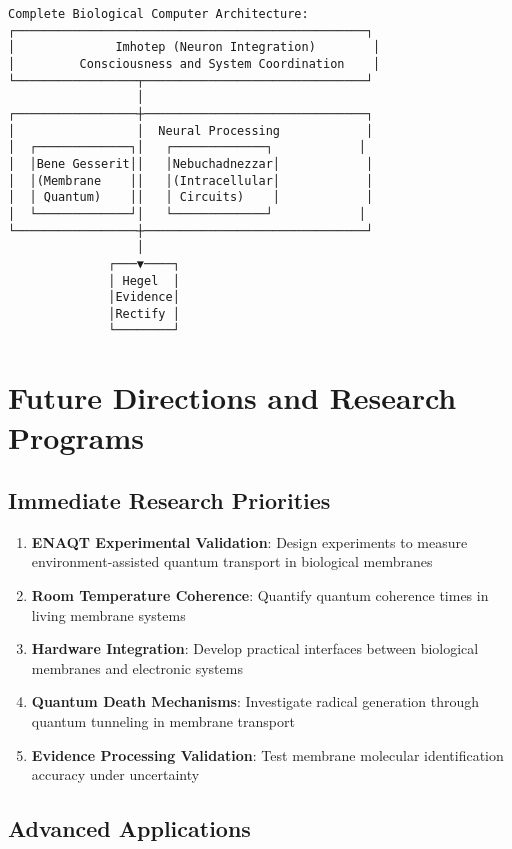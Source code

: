 \documentclass[12pt,a4paper]{article}
\begin{document}
\begin{verbatim}
Complete Biological Computer Architecture:
┌─────────────────────────────────────────────────┐
│              Imhotep (Neuron Integration)        │
│         Consciousness and System Coordination    │
└─────────────────┬───────────────────────────────┘
                  │
┌─────────────────┼───────────────────────────────┐
│                 │  Neural Processing            │
│  ┌─────────────┐│   ┌─────────────┐            │
│  │Bene Gesserit││   │Nebuchadnezzar│            │
│  │(Membrane    ││   │(Intracellular│            │
│  │ Quantum)    ││   │ Circuits)    │            │
│  └─────────────┘│   └─────────────┘            │
└─────────────────┼───────────────────────────────┘
                  │
              ┌───▼────┐
              │ Hegel  │
              │Evidence│
              │Rectify │
              └────────┘
\end{verbatim}

\section{Future Directions and Research Programs}

\subsection{Immediate Research Priorities}

\begin{enumerate}
\item \textbf{ENAQT Experimental Validation}: Design experiments to measure environment-assisted quantum transport in biological membranes
\item \textbf{Room Temperature Coherence}: Quantify quantum coherence times in living membrane systems
\item \textbf{Hardware Integration}: Develop practical interfaces between biological membranes and electronic systems
\item \textbf{Quantum Death Mechanisms}: Investigate radical generation through quantum tunneling in membrane transport
\item \textbf{Evidence Processing Validation}: Test membrane molecular identification accuracy under uncertainty
\end{enumerate}

\subsection{Advanced Applications}
\end{document}
